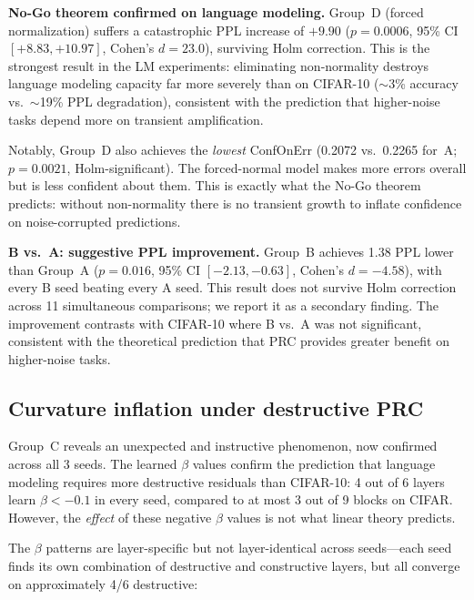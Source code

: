 \documentclass[11pt,a4paper]{article}
\theoremstyle{definition}
\begin{document}
\textbf{No-Go theorem confirmed on language modeling.}
Group~D (forced normalization) suffers a catastrophic PPL increase
of $+9.90$ ($p = 0.0006$, 95\% CI $[+8.83, +10.97]$, Cohen's
$d = 23.0$), surviving Holm correction. This is the strongest
result in the LM experiments: eliminating non-normality destroys
language modeling capacity far more severely than on CIFAR-10
($\sim$3\% accuracy vs.\ $\sim$19\% PPL degradation), consistent
with the prediction that higher-noise tasks depend more on
transient amplification.

Notably, Group~D also achieves the \emph{lowest} ConfOnErr
(0.2072 vs.\ 0.2265 for~A; $p = 0.0021$, Holm-significant).
The forced-normal model makes more errors overall but is less
confident about them. This is exactly what the No-Go theorem
predicts: without non-normality there is no transient growth
to inflate confidence on noise-corrupted predictions.

\textbf{B vs.\ A: suggestive PPL improvement.}
Group~B achieves 1.38 PPL lower than Group~A ($p = 0.016$, 95\%
CI $[-2.13, -0.63]$, Cohen's $d = -4.58$), with every B seed
beating every A seed. This result does not survive Holm correction
across 11 simultaneous comparisons; we report it as a secondary
finding. The improvement contrasts with CIFAR-10 where B vs.\ A
was not significant, consistent with the theoretical prediction
that PRC provides greater benefit on higher-noise tasks.

\subsection{Curvature inflation under destructive PRC}
\label{sec:curv-inflation}

Group~C reveals an unexpected and instructive phenomenon, now
confirmed across all 3 seeds. The learned $\beta$ values confirm
the prediction that language modeling requires more destructive
residuals than CIFAR-10: 4 out of 6 layers learn $\beta < -0.1$
in every seed, compared to at most 3 out of 9 blocks on CIFAR.
However, the \emph{effect} of these negative $\beta$ values is
not what linear theory predicts.

The $\beta$ patterns are layer-specific but not layer-identical
across seeds---each seed finds its own combination of destructive
and constructive layers, but all converge on approximately 4/6
destructive:
\end{document}
